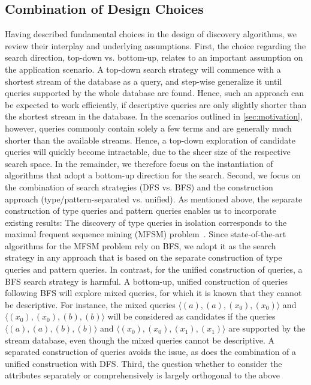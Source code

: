 \subsection{Combination of Design Choices}
\label{sec:combinations}
Having described fundamental choices in the design of discovery algorithms,
we review their interplay and underlying assumptions.
First, the choice regarding the search direction, top-down
vs. bottom-up, relates to an important assumption on the application scenario. A
top-down search strategy will commence with a shortest stream of the
database as a query, and step-wise generalize it until queries supported by
the whole database are found. Hence, such an approach can be expected
to work efficiently, if descriptive queries are only slightly shorter than
the shortest stream in the database. In the scenarios outlined
in \autoref{sec:motivation}, however, queries commonly
contain solely a few terms and are generally much shorter than the available
streams. Hence, a top-down exploration of candidate queries will
quickly become intractable, due to the sheer size of the
respective search space. In the remainder, we therefore focus on the
instantiation of algorithms that adopt a bottom-up direction for
the search.
Second, we focus on the combination of search strategies (DFS vs. BFS) and
the construction approach (type/pattern-separated vs. unified). As mentioned
above, the separate construction of type queries and pattern queries enables
us to incorporate existing results: The discovery of type queries in
isolation corresponds to the maximal frequent sequence mining (MFSM)
problem~\cite{agrawal1995}. Since state-of-the-art algorithms for the MFSM
problem rely on BFS,
we adopt it as the search strategy in any approach that is based on the
separate construction of type queries and pattern queries.
In contrast, for the unified construction of queries, a BFS search strategy is
harmful. A bottom-up, unified
construction of queries following BFS will explore mixed queries, for
which it is known that they cannot be descriptive. For instance, the mixed
queries
$\langle (a),(a),(x_0),(x_0)\rangle$ and $\langle (x_0),(x_0),(b),(b) \rangle$ will be
considered as candidates if the queries $\langle (a),(a),(b),(b) \rangle$ and
$\langle (x_0),(x_0),(x_1),(x_1) \rangle$ are supported by the
stream database, even
though the mixed queries cannot be descriptive. A separated construction of
queries avoids the issue, as
does the combination of a unified construction with DFS.
Third, the question whether to consider the attributes
separately or comprehensively is largely orthogonal to the above
